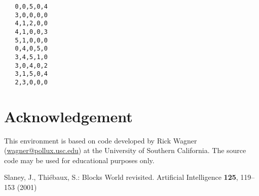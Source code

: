 \documentclass{article}
\begin{document}
\begin{verbatim}
   0,0,5,0,4
   3,0,0,0,0
   4,1,2,0,0
   4,1,0,0,3
   5,1,0,0,0
   0,4,0,5,0
   3,4,5,1,0
   3,0,4,0,2
   3,1,5,0,4
   2,3,0,0,0
\end{verbatim}

%
%
\section*{Acknowledgement}
%
This environment is based on code developed by Rick Wagner (\url{wagner@pollux.usc.edu}) at the University of Southern California. The source code may be used for educational purposes only.


\begin{thebibliography}{9}
Slaney, J., Thi\'ebaux, S.: {Blocks World revisited}.
\newblock Artificial Intelligence \textbf{125}, 119--153 (2001)
\end{thebibliography}
\end{document}

